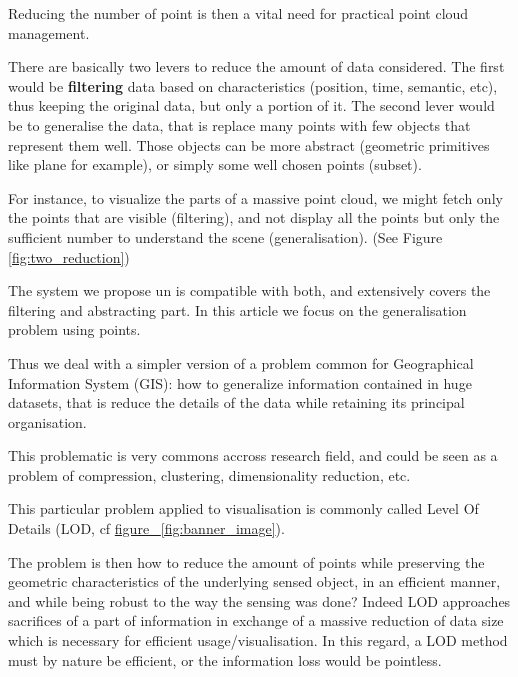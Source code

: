 		Reducing the number of point is then a vital need for practical point cloud management.
		
		There are basically two levers to reduce the amount of data considered. The first would be \textbf{filtering} data based on characteristics (position, time, semantic, etc), thus keeping the original data, but only a portion of it.
		The second lever would be to generalise the data, that is replace many points with few objects that represent them well. Those objects can be more abstract (geometric primitives like plane for example), or simply some well chosen points (subset).
		
		For instance, to visualize the parts of a massive point cloud, we might fetch only the points that are visible (filtering),
		and not display all the points but only the sufficient number to understand the scene (generalisation).
		(See Figure \ref{fig:two_reduction})
		
		The system we propose un \cite{cura2015} is compatible with both, and extensively covers the filtering and abstracting part. In this article we focus on the generalisation problem using points.
		
		Thus we deal with a simpler version of a problem common for Geographical Information System (GIS): how to generalize information contained in huge datasets, that is reduce the details of the data while retaining its principal organisation.
		 
		This problematic is very commons accross research field, and could be seen as a problem of compression, clustering, dimensionality reduction, etc.
	  
		This particular problem applied to visualisation is commonly called Level Of Details (LOD, cf \href{banner_image}{figure ~\ref{fig:banner_image}}).
		
		The problem is then how to reduce the amount of points while preserving the geometric characteristics of the underlying sensed object, in an efficient manner, and while being robust to the way the sensing was done?
		Indeed LOD approaches sacrifices of a part of information in exchange of a massive reduction of data size which is necessary for efficient usage/visualisation. In this regard, a LOD method must by nature be efficient, or the information loss would be pointless.
		
		

